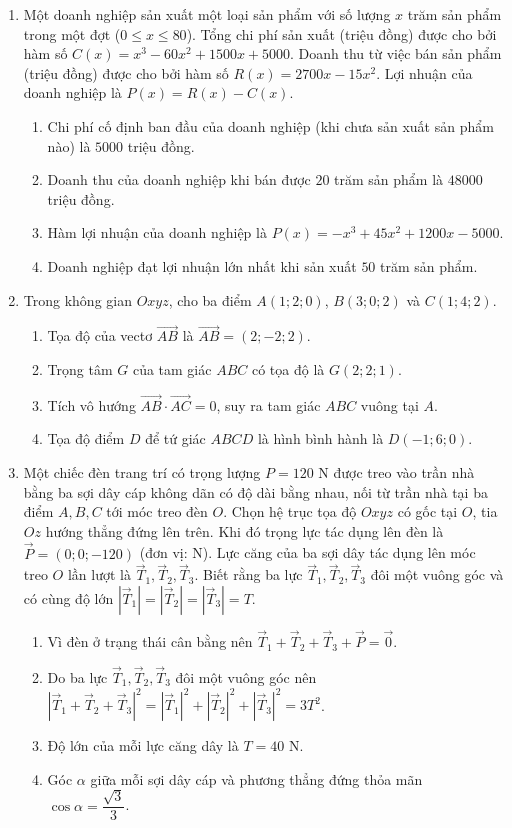 \documentclass[12pt,a4paper]{article}
\begin{document}
\newpage
\begin{enumerate}[start=2]
\item Một doanh nghiệp sản xuất một loại sản phẩm với số lượng $x$ trăm sản phẩm trong một đợt ($0\le x\le 80$). Tổng chi phí sản xuất (triệu đồng) được cho bởi hàm số $C(x)=x^3-60x^2+1500x+5000$. Doanh thu từ việc bán sản phẩm (triệu đồng) được cho bởi hàm số $R(x)=2700x-15x^2$. Lợi nhuận của doanh nghiệp là $P(x)=R(x)-C(x)$.
\begin{enumerate}
\item Chi phí cố định ban đầu của doanh nghiệp (khi chưa sản xuất sản phẩm nào) là $5000$ triệu đồng.
\item Doanh thu của doanh nghiệp khi bán được $20$ trăm sản phẩm là $48000$ triệu đồng.
\item Hàm lợi nhuận của doanh nghiệp là $P(x)=-x^3+45x^2+1200x-5000$.
\item Doanh nghiệp đạt lợi nhuận lớn nhất khi sản xuất $50$ trăm sản phẩm.
\end{enumerate}

\item Trong không gian $Oxyz$, cho ba điểm $A(1;2;0)$, $B(3;0;2)$ và $C(1;4;2)$.
\begin{enumerate}
\item Tọa độ của vectơ $\vec{AB}$ là $\vec{AB}=(2;-2;2)$.
\item Trọng tâm $G$ của tam giác $ABC$ có tọa độ là $G(2;2;1)$.
\item Tích vô hướng $\vec{AB}\cdot\vec{AC}=0$, suy ra tam giác $ABC$ vuông tại $A$.
\item Tọa độ điểm $D$ để tứ giác $ABCD$ là hình bình hành là $D(-1;6;0)$.
\end{enumerate}

\item Một chiếc đèn trang trí có trọng lượng $P=120\text{ N}$ được treo vào trần nhà bằng ba sợi dây cáp không dãn có độ dài bằng nhau, nối từ trần nhà tại ba điểm $A, B, C$ tới móc treo đèn $O$. Chọn hệ trục tọa độ $Oxyz$ có gốc tại $O$, tia $Oz$ hướng thẳng đứng lên trên. Khi đó trọng lực tác dụng lên đèn là $\vec{P}=(0;0;-120)$ (đơn vị: N). Lực căng của ba sợi dây tác dụng lên móc treo $O$ lần lượt là $\vec{T}_1, \vec{T}_2, \vec{T}_3$. Biết rằng ba lực $\vec{T}_1, \vec{T}_2, \vec{T}_3$ đôi một vuông góc và có cùng độ lớn $|\vec{T}_1|=|\vec{T}_2|=|\vec{T}_3|=T$.
\begin{enumerate}
\item Vì đèn ở trạng thái cân bằng nên $\vec{T}_1+\vec{T}_2+\vec{T}_3+\vec{P}=\vec{0}$.
\item Do ba lực $\vec{T}_1, \vec{T}_2, \vec{T}_3$ đôi một vuông góc nên $|\vec{T}_1+\vec{T}_2+\vec{T}_3|^2=|\vec{T}_1|^2+|\vec{T}_2|^2+|\vec{T}_3|^2=3T^2$.
\item Độ lớn của mỗi lực căng dây là $T=40\text{ N}$.
\item Góc $\alpha$ giữa mỗi sợi dây cáp và phương thẳng đứng thỏa mãn $\cos\alpha=\dfrac{\sqrt{3}}{3}$.
\end{enumerate}
\end{enumerate}
\end{document}
